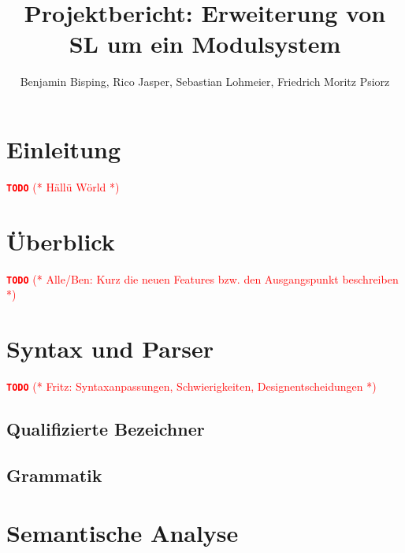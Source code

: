 \documentclass{llncs}
\author{Benjamin Bisping, Rico Jasper, Sebastian Lohmeier,
	Friedrich Moritz Psiorz}
\title{Projektbericht: Erweiterung von SL um ein Modulsystem}
\institute{Compilerbauprojekt SoSe 2013, Technische Universität Berlin}
\newcommand{\TODO}[1]{ \textcolor{red}{\textbf{\texttt{\large{TODO}}} (* #1 *)}\par}
\begin{document}
\def\open{\texttt{(}}
\def\close{\texttt{)}}
\def\bropen{\texttt{\{}}
\def\brclose{\texttt{\}}}
\def\sqopen{\texttt{[}}
\def\sqclose{\texttt{]}}
\def\squote{\texttt{'}}
\def\dquote{\texttt{''}}
\def\eq{\texttt{=}}
\def\colon{\texttt{:}}
\def\lam{\mbox{\texttt{\BackslashTT}}}
\def\bar{\texttt{|}}
\def\comma{\texttt{,}}
\def\arrow{\texttt{->}}

\def\addint{\texttt{+}}
\def\subint{\texttt{-}}
\def\mulint{\texttt{*}}
\def\divint{\texttt{/}}

\def\ltint{\texttt{<}}
\def\leint{\texttt{<=}}
\def\eqint{\texttt{==}}
\def\neint{\texttt{/=}}
\def\geint{\texttt{>=}}
\def\gtint{\texttt{>}}

\def\exclamationOp{\texttt{!}}
\def\paragraphOp{\texttt{§}}
\def\percentOp{\texttt{\%}}
\def\ampOp{\texttt{\&}}
\def\questionOp{\texttt{?}}
\def\sharpOp{\texttt{\#}}
\def\pipeOp{\texttt{|}}

\maketitle


\section{Einleitung}

\TODO{Hällü Wörld}

\section{Überblick}

\TODO{Alle/Ben: Kurz die neuen Features bzw. den Ausgangspunkt beschreiben}

\section{Syntax und Parser}

\TODO{Fritz: Syntaxanpassungen, Schwierigkeiten, Designentscheidungen}

\subsection{Qualifizierte Bezeichner}

\subsection{Grammatik}

\section{Semantische Analyse}
\end{document}
